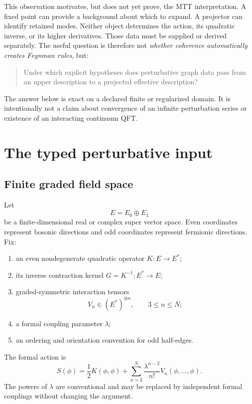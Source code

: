 \documentclass[11pt,a4paper]{article}
\begin{document}
This observation motivates, but does not yet prove, the MTT interpretation.
A fixed point can provide a background about which to expand.  A projector
can identify retained modes.  Neither object determines the action, its
quadratic inverse, or its higher derivatives.  Those data must be supplied
or derived separately.  The useful question is therefore not
\emph{whether coherence automatically creates Feynman rules}, but:
\begin{quote}
Under which explicit hypotheses does perturbative graph data pass from an
upper description to a projected effective description?
\end{quote}

The answer below is exact on a declared finite or regularized domain.  It
is intentionally not a claim about convergence of an infinite
perturbation series or existence of an interacting continuum QFT.

\section{The typed perturbative input}

\subsection{Finite graded field space}

Let
\[
 E=E_{\bar 0}\oplus E_{\bar 1}
\]
be a finite-dimensional real or complex super vector space.  Even
coordinates represent bosonic directions and odd coordinates represent
fermionic directions.  Fix:
\begin{enumerate}
\item an even nondegenerate quadratic operator \(K:E\to E^*\);
\item its inverse contraction kernel \(G=K^{-1}:E^*\to E\);
\item graded-symmetric interaction tensors
\[
 V_n\in (E^*)^{\otimes n},\qquad 3\leq n\leq N;
\]
\item a formal coupling parameter \(\lambda\);
\item an ordering and orientation convention for odd half-edges.
\end{enumerate}
The formal action is
\begin{equation}
 S(\phi)=\frac12 K(\phi,\phi)
 +\sum_{n=3}^{N}\frac{\lambda^{n-2}}{n!}V_n(\phi,\ldots,\phi).
 \label{eq:action}
\end{equation}
The powers of \(\lambda\) are conventional and may be replaced by
independent formal couplings without changing the argument.
\end{document}
